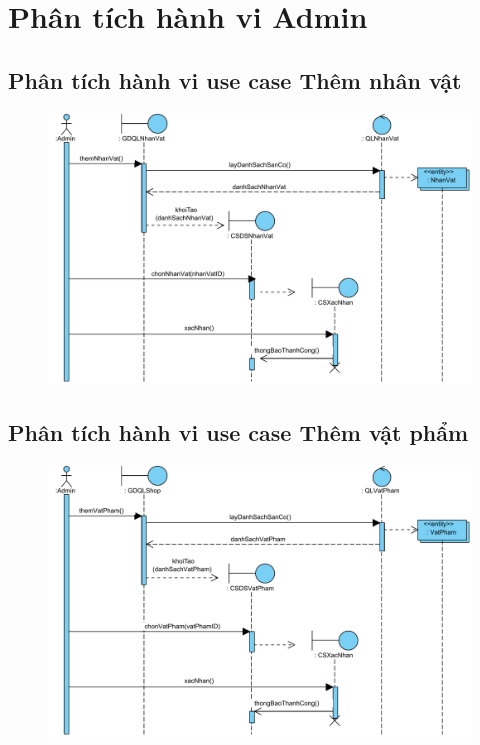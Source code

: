 \documentclass[3p]{elsarticle}
\begin{document}
\section{Phân tích hành vi Admin}
\subsection{Phân tích hành vi use case Thêm nhân vật}
\begin{figure}[!htbp]
	\hspace*{-.5in}
	\centering
	\includegraphics[scale=.55]{images/sequence-pdfs/admin/addCharacter.pdf}
\end{figure}
\newpage

\subsection{Phân tích hành vi use case Thêm vật phẩm}
\begin{figure}[!htbp]
	\hspace*{-.5in}
	\centering
	\includegraphics[scale=.55]{images/sequence-pdfs/admin/addItem.pdf}
\end{figure}
\newpage
\end{document}

